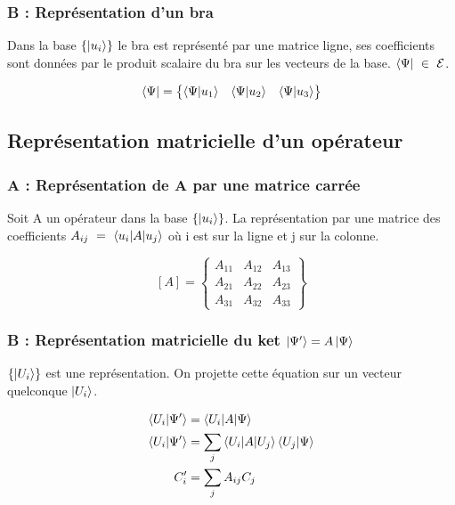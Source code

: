\documentclass[12pt,a4paper,titlepage]{book}
\begin{document}
\subsubsection{B : Représentation d'un bra}

Dans la base $\lbrace \ket{u_i} \rbrace$ le bra est représenté par une matrice ligne, ses coefficients sont données par le produit scalaire du bra sur les vecteurs de la base. $\bra{\Psi} ~\in~ \mathcal{E}$.\\

\begin{center}
\[
\bra{\Psi}=
\left\lbrace
\begin{matrix}
\braket{\Psi | u_1} & \braket{\Psi | u_2} & \braket{\Psi | u_3}\\
\end{matrix}
\right\rbrace
\]
\end{center}

\subsection{Représentation matricielle d'un opérateur}
\subsubsection{A : Représentation de A par une matrice carrée}

Soit A un opérateur dans la base $\lbrace \ket{u_i} \rbrace$. La représentation par une matrice des coefficients $A_{ij} ~=~ \braket{u_i | A | u_j}$ où i est sur la ligne et j sur la colonne.

\begin{center}
\[
[A]=
\left\lbrace
\begin{matrix}
A_{11} & A_{12} & A_{13}\\
A_{21} & A_{22} & A_{23}\\
A_{31} & A_{32} & A_{33}
\end{matrix}
\right\rbrace
\]
\end{center}

\subsubsection{B : Représentation matricielle du ket $\ket{\Psi'} = A \ket{\Psi}$}

$\left\lbrace \ket{U_i} \right\rbrace$ est une représentation. On projette cette équation sur un vecteur quelconque $\ket{U_i}$.

\begin{align*}
\braket{U_i | \Psi'} &= \braket{U_i | A | \Psi}\\
\braket{U_i | \Psi'} &= \sum\limits_{j} \braket{U_i | A | U_j} \braket{U_j | \Psi}\\
C_i' &= \sum\limits_j A_{i j} C_j
\end{align*}
\end{document}
